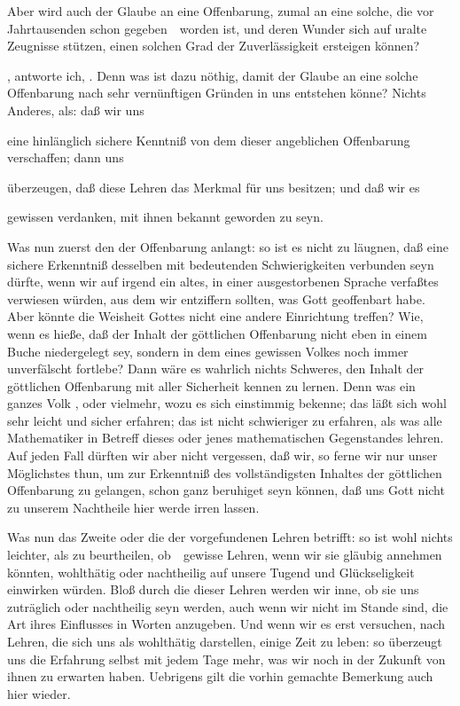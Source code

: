 \begin{aufza}
\item  Aber wird auch der Glaube an eine Offenbarung, zumal an eine solche, die vor Jahrtausenden schon gegeben~\ worden ist, und deren Wunder sich auf uralte Zeugnisse stützen, einen solchen Grad der Zuverlässigkeit ersteigen können?
\item  {}, antworte ich, . Denn was ist dazu nöthig, damit der Glaube an eine solche Offenbarung nach sehr vernünftigen Gründen in uns entstehen könne? Nichts Anderes, als: daß wir uns
\begin{aufzb}
\item  eine hinlänglich sichere Kenntniß von dem  dieser angeblichen Offenbarung verschaffen; dann uns
\item  überzeugen, daß diese Lehren das Merkmal  für uns besitzen; und daß wir es
\item  gewissen  verdanken, mit ihnen bekannt geworden zu seyn.
\end{aufzb}
\item  Was nun zuerst den  der Offenbarung anlangt: so ist es nicht zu läugnen, daß eine sichere Erkenntniß desselben mit bedeutenden Schwierigkeiten verbunden seyn dürfte, wenn wir auf irgend ein altes, in einer ausgestorbenen Sprache verfaßtes  verwiesen würden, aus dem wir entziffern sollten, was Gott geoffenbart habe. Aber könnte die Weisheit Gottes nicht eine andere Einrichtung treffen? Wie, wenn es hieße, daß der Inhalt der göttlichen Offenbarung nicht eben in einem Buche niedergelegt sey, sondern in dem  eines gewissen Volkes noch immer unverfälscht fortlebe? Dann wäre es wahrlich nichts Schweres, den Inhalt der göttlichen Offenbarung mit aller Sicherheit kennen zu lernen. Denn was ein ganzes Volk , oder vielmehr, wozu es sich einstimmig bekenne; das läßt sich wohl sehr leicht und sicher erfahren; das ist nicht schwieriger zu erfahren, als was alle Mathematiker in Betreff dieses oder jenes mathematischen Gegenstandes lehren. Auf jeden Fall dürften wir aber nicht vergessen, daß wir, so ferne wir nur unser Möglichstes thun, um zur Erkenntniß des vollständigsten Inhaltes der göttlichen Offenbarung zu gelangen, schon ganz beruhiget seyn können, daß uns Gott nicht zu unserem Nachtheile hier werde irren lassen.
\item  Was nun das Zweite oder die  der vorgefundenen Lehren betrifft: so ist wohl nichts leichter, als zu beurtheilen, ob~\ gewisse Lehren, wenn wir sie gläubig annehmen könnten, wohlthätig oder nachtheilig auf unsere Tugend und Glückseligkeit einwirken würden. Bloß durch die  dieser Lehren werden wir inne, ob sie uns zuträglich oder nachtheilig seyn werden, auch wenn wir nicht im Stande sind, die Art ihres Einflusses in Worten anzugeben. Und wenn wir es erst versuchen, nach Lehren, die sich uns als wohlthätig darstellen, einige Zeit zu leben: so überzeugt uns die Erfahrung selbst mit jedem Tage mehr, was wir noch in der Zukunft von ihnen zu erwarten haben. Uebrigens gilt die vorhin gemachte Bemerkung auch hier wieder.

\end{aufza}
